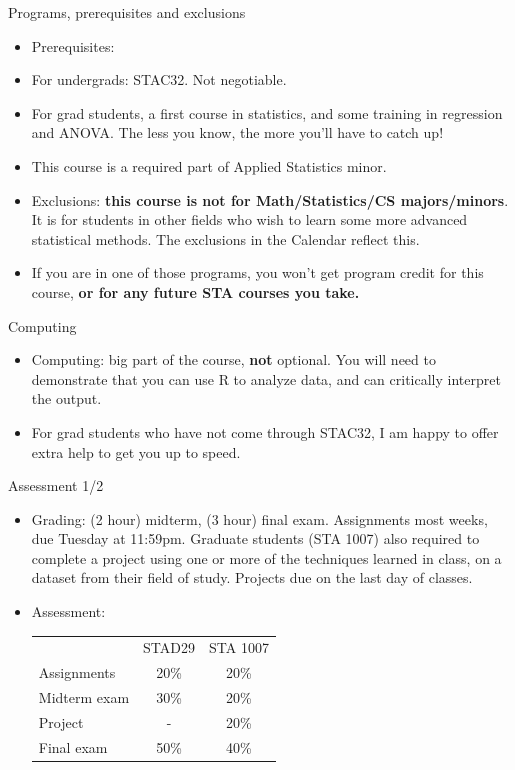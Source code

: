 \documentclass[
  ignorenonframetext,
]{beamer}
\begin{document}
\begin{frame}{Programs, prerequisites and exclusions}
\protect\hypertarget{programs-prerequisites-and-exclusions}{}

\begin{itemize}
\item
  Prerequisites:
\item
  For undergrads: STAC32. Not negotiable.
\item
  For grad students, a first course in statistics, and some training in
  regression and ANOVA. The less you know, the more you'll have to catch
  up!
\item
  This course is a required part of Applied Statistics minor.
\item
  Exclusions: \textbf{this course is not for Math/Statistics/CS
  majors/minors}. It is for students in other fields who wish to learn
  some more advanced statistical methods. The exclusions in the Calendar
  reflect this.
\item
  If you are in one of those programs, you won't get program credit for
  this course, \textbf{or for any future STA courses you take.}
\end{itemize}

\end{frame}

\begin{frame}{Computing}
\protect\hypertarget{computing}{}

\begin{itemize}
\item
  Computing: big part of the course, \textbf{not} optional. You will
  need to demonstrate that you can use R to analyze data, and can
  critically interpret the output.
\item
  For grad students who have not come through STAC32, I am happy to
  offer extra help to get you up to speed.
\end{itemize}

\end{frame}

\begin{frame}{Assessment 1/2}
\protect\hypertarget{assessment-12}{}

\begin{itemize}
\item
  Grading: (2 hour) midterm, (3 hour) final exam. Assignments most
  weeks, due Tuesday at 11:59pm. Graduate students (STA 1007) also
  required to complete a project using one or more of the techniques
  learned in class, on a dataset from their field of study. Projects due
  on the last day of classes.
\item
  Assessment:

  \begin{tabular}{lcc}
  & STAD29 & STA 1007\\
  Assignments & 20\% & 20\%\\
  Midterm exam & 30\%  & 20\% \\
  Project & - & 20\%\\
  Final exam & 50\% & 40\%
  \end{tabular}
\end{itemize}

\end{frame}
\end{document}
